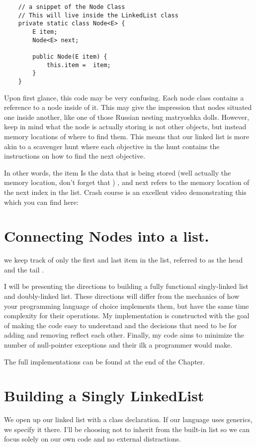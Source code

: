 \begin{verbatim}
	// a snippet of the Node Class
	// This will live inside the LinkedList class
	private static class Node<E> {
		E item;
		Node<E> next;
		
		public Node(E item) {
			this.item =  item;
		}
	} 
\end{verbatim}
Upon first glance, this code may be very confusing. Each node class contains a reference to a node inside of it.  This may give the impression that nodes  situated one inside another, like one of those Russian nesting matryoshka dolls.  
However, keep in mind what the node is actually storing is not other objects, but instead memory locations of where to find them.
This means that our linked list is more akin to a scavenger hunt where each objective in the hunt contains the instructions on how to find the next objective.

In other words, the item Is the data that is being stored (well actually the memory location, don't forget that ) , and next refers to the memory location of the next index in the list.  Crash course is an excellent video demonstrating this which you can find here: %


\section{Connecting Nodes into a list.}





we keep track of only the first and last item in the list, referred to as the head and the tail . 


I will be presenting the directions to building a fully functional  singly-linked list and doubly-linked list.  
These directions will differ from the mechanics of how your programming language of choice implements them, but have the same time complexity for their operations.
My implementation is constructed with the goal of making the code easy to understand and the decisions that need to be for adding and removing reflect each other.
Finally, my code aims to minimize the number of null-pointer exceptions and their ilk a programmer would make.

The full implementations can be found at the end of the Chapter.

\section{Building a Singly LinkedList}
We open up our linked list with a class declaration. 
If our language uses generics, we specify it there.
I'll be choosing not to inherit from the built-in list so we can focus solely on our own code and no external distractions.


